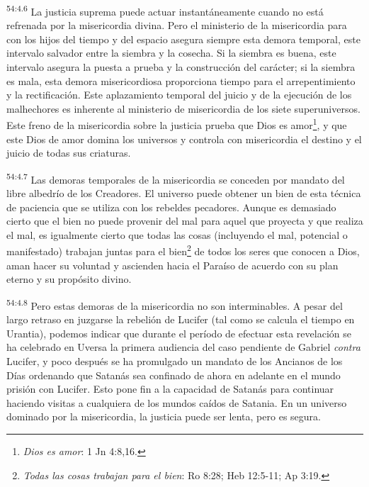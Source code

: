 \par
\textsuperscript{54:4.6} La justicia suprema puede actuar instantáneamente cuando no está refrenada por la misericordia divina. Pero el ministerio de la misericordia para con los hijos del tiempo y del espacio asegura siempre esta demora temporal, este intervalo salvador entre la siembra y la cosecha. Si la siembra es buena, este intervalo asegura la puesta a prueba y la construcción del carácter; si la siembra es mala, esta demora misericordiosa proporciona tiempo para el arrepentimiento y la rectificación. Este aplazamiento temporal del juicio y de la ejecución de los malhechores es inherente al ministerio de misericordia de los siete superuniversos. Este freno de la misericordia sobre la justicia prueba que Dios es amor\footnote{\textit{Dios es amor}: 1 Jn 4:8,16.}, y que este Dios de amor domina los universos y controla con misericordia el destino y el juicio de todas sus criaturas.

\par
\textsuperscript{54:4.7} Las demoras temporales de la misericordia se conceden por mandato del libre albedrío de los Creadores. El universo puede obtener un bien de esta técnica de paciencia que se utiliza con los rebeldes pecadores. Aunque es demasiado cierto que el bien no puede provenir del mal para aquel que proyecta y que realiza el mal, es igualmente cierto que todas las cosas (incluyendo el mal, potencial o manifestado) trabajan juntas para el bien\footnote{\textit{Todas las cosas trabajan para el bien}: Ro 8:28; Heb 12:5-11; Ap 3:19.} de todos los seres que conocen a Dios, aman hacer su voluntad y ascienden hacia el Paraíso de acuerdo con su plan eterno y su propósito divino.

\par
\textsuperscript{54:4.8} Pero estas demoras de la misericordia no son interminables. A pesar del largo retraso en juzgarse la rebelión de Lucifer (tal como se calcula el tiempo en Urantia), podemos indicar que durante el período de efectuar esta revelación se ha celebrado en Uversa la primera audiencia del caso pendiente de Gabriel \textit{contra} Lucifer, y poco después se ha promulgado un mandato de los Ancianos de los Días ordenando que Satanás sea confinado de ahora en adelante en el mundo prisión con Lucifer. Esto pone fin a la capacidad de Satanás para continuar haciendo visitas a cualquiera de los mundos caídos de Satania. En un universo dominado por la misericordia, la justicia puede ser lenta, pero es segura.

